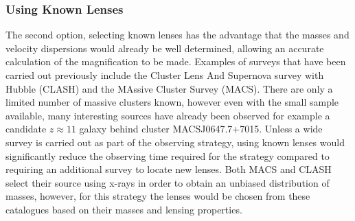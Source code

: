 	\subsubsection{Using Known Lenses} %
	\label{sub:using_known_lenses}
		The second option, selecting known lenses has the advantage that the masses and velocity dispersions would already be well determined, allowing an accurate calculation of the magnification to be made. Examples of surveys that have been carried out previously include the Cluster Lens And Supernova survey with Hubble (CLASH)\cite{CLASH} and the MAssive Cluster Survey (MACS)\cite{MACS}. There are only a limited number of massive clusters known, however even with the small sample available, many interesting sources have already been observed for example a candidate $z\approx11$ galaxy behind cluster MACSJ0647.7+7015\cite{CLASH_z11_candidate}. Unless a wide survey is carried out as part of the observing strategy, using known lenses would significantly reduce the observing time required for the strategy compared to requiring an additional survey to locate new lenses. Both MACS and CLASH select their source using x-rays in order to obtain an unbiased distribution of masses, however, for this strategy the lenses would be chosen from these catalogues based on their masses and lensing properties.

